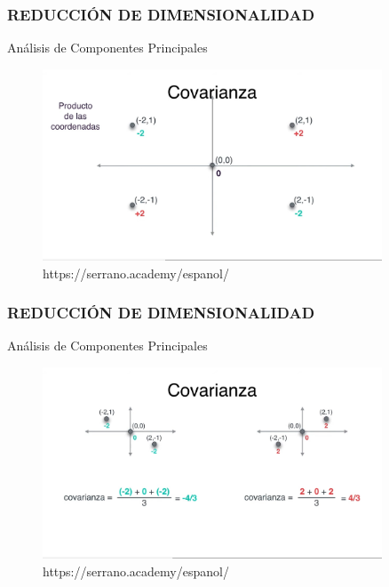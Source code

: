 \documentclass{beamer}
\begin{document}
\begin{frame}
	\frametitle{REDUCCIÓN DE DIMENSIONALIDAD}
	\begin{block}{Análisis de Componentes Principales}	
		\begin{figure}
			\includegraphics[width=0.9\textwidth]{PCA/IMG_3556.jpg}
			\caption{https://serrano.academy/espanol/}
		\end{figure}
	\end{block}
\end{frame}

\begin{frame}
	\frametitle{REDUCCIÓN DE DIMENSIONALIDAD}
	\begin{block}{Análisis de Componentes Principales}	
		\begin{figure}
			\includegraphics[width=0.9\textwidth]{PCA/IMG_3557.jpg}
			\caption{https://serrano.academy/espanol/}
		\end{figure}
	\end{block}
\end{frame}
\end{document}
